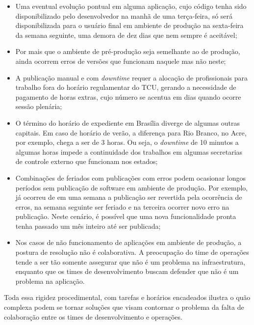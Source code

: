 \begin{itemize}
\item Uma eventual evolução pontual em alguma aplicação, cujo código tenha sido
disponibilizado pelo desenvolvedor na manhã de uma terça-feira, só será
disponibilizada para o usuário final em ambiente de produção na sexta-feira da
semana seguinte, uma demora de dez dias que nem sempre é aceitável;

\item Por mais que o ambiente de pré-produção seja semelhante ao de produção,
ainda ocorrem erros de versões que funcionam naquele mas não neste;

\item A publicação manual e com \textit{downtime} requer a alocação de
profissionais para trabalho fora do horário regulamentar do \acrshort{TCU},
gerando a necessidade de pagamento de horas extras, cujo número se acentua
em dias quando ocorre sessão plenária;

\item O término do horário de expediente em Brasília diverge de algumas outras
capitais. Em caso de horário de verão, a diferença para Rio Branco, no Acre,
por exemplo, chega a ser de 3 horas. Ou seja, o \textit{downtime} de 10 minutos
a algumas horas impede a continuidade dos trabalhos em algumas secretarias
de controle externo que funcionam nos estados;

\item Combinações de feriados com publicações com erros podem ocasionar longos
períodos sem publicação de software em ambiente de produção. Por exemplo, já
ocorreu de em uma semana a publicação ser revertida pela ocorrência de erros,
na semana seguinte ser feriado e na terceira ocorrer novo erro na publicação.
Neste cenário, é possível que uma nova funcionalidade pronta tenha passado um mês
inteiro até ser publicada;

\item Nos casos de não funcionamento de aplicações em ambiente de produção,
a postura de resolução não é colaborativa. A preocupação do time de operações
tende a ser tão somente assegurar que não é um problema na infraestrutura,
enquanto que os times de desenvolvimento buscam defender que não é um problema
na aplicação.

\end{itemize}

Toda essa rigidez procedimental, com tarefas e horários encadeados ilustra o
quão complexa podem se tornar soluções que visam contornar o problema da falta
de colaboração entre os times de desenvolvimento e operações.

